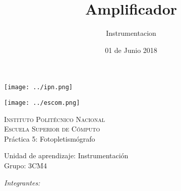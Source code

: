\documentclass[12pt]{article}
\date{ 01 de Junio 2018}
\title{Amplificador}
\author{Instrumentacion}
\begin{document}
        \begin{titlepage}
            \begin{center}
                
                
                \noindent
                \begin{minipage}{0.5\textwidth}
                    \begin{flushleft} \large
                        \texttt{[image: ../ipn.png]}
                    \end{flushleft}
                \end{minipage}%
                \begin{minipage}{0.55\textwidth}
                    \begin{flushright} \large
                        \texttt{[image: ../escom.png]}
                    \end{flushright}
                \end{minipage}
                
                \textsc{\LARGE Instituto Politécnico Nacional}\\[0.5cm]
                
                \textsc{\Large Escuela Superior de Cómputo}\\[1cm]
                
                
                { \huge Práctica 5: Fotopletismógrafo \\[1cm] }
                
                { \Large Unidad de aprendizaje: Instrumentación} \\[1cm]
                
                { \Large Grupo: 3CM4 } \\[1cm]
                
                \noindent
                \begin{minipage}{0.5\textwidth}
                    \begin{flushleft} \large
                        \emph{Integrantes:}\\
                        

\end{flushleft}
\end{minipage}
\end{center}
\end{titlepage}
\end{document}
